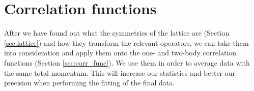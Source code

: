 
  
\section{Correlation functions}
\label{sec:sym-corr}

After we have found out what the symmetries of the lattice are (Section \ref{sec:lattice}) and how they transform the relevant operators, we can take them into consideration and apply them onto the one- and two-body correlation functions (Section \ref{sec:corr_func}). We use them in order to average data with the same total momentum. This will increase our statistics and better our precision when performing the fitting of the final data.

